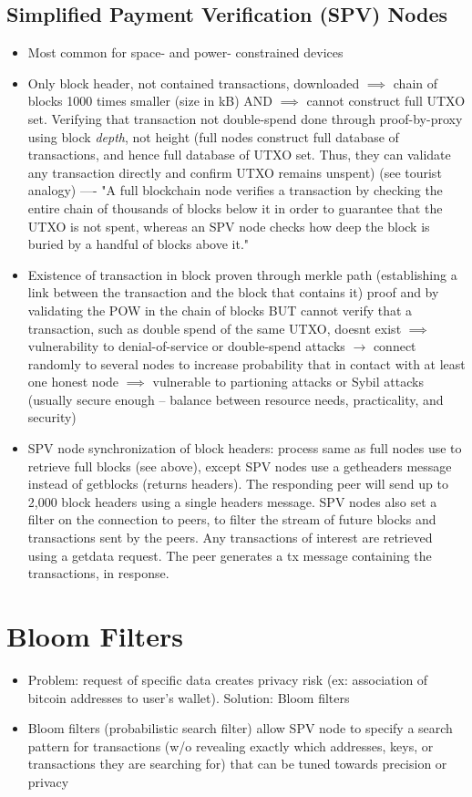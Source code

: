 \documentclass[english, 11pt]{article}
\begin{document}
\subsection{Simplified Payment Verification (SPV) Nodes}
\begin{itemize}
    \item Most common for space- and power- constrained devices
    \item Only block header, not contained transactions, downloaded $\implies$ chain of blocks 1000 times smaller (size in kB) AND $\implies$ cannot construct full UTXO set. Verifying that transaction not double-spend done through proof-by-proxy using block \textit{depth}, not height (full nodes construct full database of transactions, and hence full database of UTXO set. Thus, they can validate any transaction directly and confirm UTXO remains unspent) (see tourist analogy) ---- "A full blockchain node verifies a transaction by checking the entire chain of thousands of blocks below it in order to guarantee that the UTXO is not spent, whereas an SPV node checks how deep the block is buried by a handful of blocks above it."
    \item Existence of transaction in block proven through merkle path (establishing a link between the transaction and the block that contains it) proof and by validating the POW in the chain of blocks BUT cannot verify that a transaction, such as double spend of the same UTXO, doesnt exist $\implies$ vulnerability to denial-of-service or double-spend attacks $\rightarrow$ connect randomly to several nodes to increase probability that in contact with at least one honest node $\implies$ vulnerable to partioning attacks or Sybil attacks (usually secure enough -- balance between resource needs, practicality, and security)
    \item SPV node synchronization of block headers: process same as full nodes use to retrieve full blocks (see above), except SPV nodes use a getheaders message instead of getblocks (returns headers). The responding peer will send up to 2,000 block headers using a single headers message. SPV nodes also set a filter on the connection to peers, to filter the stream of future blocks and transactions sent by the peers. Any transactions of interest are retrieved using a getdata request. The peer generates a tx message containing the transactions, in response.
\end{itemize}

\section{Bloom Filters}
\begin{itemize}
    \item Problem: request of specific data creates privacy risk (ex: association of bitcoin addresses to user's wallet). Solution: Bloom filters
    \item Bloom filters (probabilistic search filter) allow SPV node to specify a search pattern for transactions (w/o revealing exactly which addresses, keys, or transactions they are searching for) that can be tuned towards precision or privacy 
\end{itemize}
\end{document}
